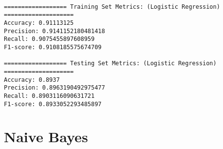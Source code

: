 \documentclass[11pt]{article}
\begin{document}
    \begin{Verbatim}[commandchars=\\\{\}]

================== Training Set Metrics: (Logistic Regression)
====================
Accuracy: 0.91113125
Precision: 0.9141152180481418
Recall: 0.9075455897608959
F1-score: 0.9108185575674709

================== Testing Set Metrics: (Logistic Regression)
====================
Accuracy: 0.8937
Precision: 0.8963190492975477
Recall: 0.8903116090631721
F1-score: 0.8933052293485897
    \end{Verbatim}

    \section{Naive Bayes}\label{naive-bayes}
\end{document}
